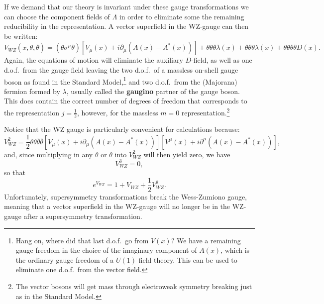 \documentclass[notes.tex]{subfiles}
\begin{document}
If we demand that our theory is invariant under these gauge transformations we can choose the component fields of $\Lambda$ in order to eliminate some the remaining reducibility  in the representation. 
A vector superfield in the WZ-gauge can then be written:
\begin{equation}
V_{WZ} (x, \theta, \bar{\theta}) = (\theta\sigma^\mu \bar{\theta})[V_\mu(x) + i\partial_\mu(A(x) - A^*(x))] + \theta\theta\bar{\theta}\bar{\lambda}(x) + \bar{\theta}\bar{\theta}\theta\lambda (x) + \theta\theta\bar{\theta}\bar{\theta}D(x).
\label{eq:vectorsuperfieldWZ}
\end{equation}
Again, the equations of motion will eliminate the auxiliary $D$-field, as well as one d.o.f.\ from the gauge field leaving the  two d.o.f.\ of a massless on-shell gauge boson as found in the Standard Model,\footnote{Hang on, where did that last d.o.f.\ go from $V(x)$? We have a remaining gauge freedom in the choice of the imaginary component of $A(x)$, which is the ordinary gauge freedom of a $U(1)$ field theory. This can be used to eliminate one d.o.f.\ from the vector field.}  and two d.o.f.\ from the (Majorana) fermion formed by $\lambda$, usually called the {\bf gaugino} partner of the gauge boson. This does contain the correct number of degrees of freedom that corresponds to the representation $j=\frac{1}{2}$, however, for the massless $m=0$ representation.\footnote{The vector bosons will get mass through electroweak symmetry breaking just as in the Standard Model.}

Notice that the WZ gauge is particularly convenient for calculations because:
\begin{equation}
V_{WZ}^2 = \frac{1}{2}\theta\theta\bar{\theta}\bar{\theta}[V_\mu(x) + i\partial_\mu(A(x) - A^*(x))][V^\mu(x) + i\partial^\mu(A(x) - A^*(x))],
\label{eq:V2_WZ}
\end{equation}
and, since multiplying in any $\theta$ or $\bar\theta$ into $V_{WZ}^2$ will then yield zero, we have 
\[V_{WZ}^3 = 0,\]
so that 
\[e^{V_{WZ}} = 1 + V_{WZ} + \frac{1}{2}V_{WZ}^2.\]
Unfortunately, supersymmetry transformations break the Wess-Zumiono gauge, meaning that a vector superfield in the WZ-gauge will no longer be in the WZ-gauge after a supersymmetry transformation. 
\end{document}
